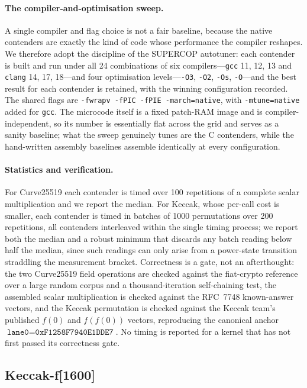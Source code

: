 \paragraph{The compiler-and-optimisation sweep.}
A single compiler and flag choice is not a fair baseline, because the native
contenders are exactly the kind of code whose performance the compiler reshapes.
We therefore adopt the discipline of the SUPERCOP autotuner: each contender is
built and run under all 24 combinations of six compilers---\texttt{gcc}
11, 12, 13 and \texttt{clang} 14, 17, 18---and four optimisation
levels---\texttt{-O3}, \texttt{-O2}, \texttt{-Os}, \texttt{-O}---and the best
result for each contender is retained, with the winning configuration recorded.
The shared flags are \texttt{-fwrapv -fPIC -fPIE -march=native}, with
\texttt{-mtune=native} added for \texttt{gcc}. The microcode itself is a fixed
patch-RAM image and is compiler-independent, so its number is essentially flat
across the grid and serves as a sanity baseline; what the sweep genuinely tunes
are the C contenders, while the hand-written assembly baselines assemble
identically at every configuration.

\paragraph{Statistics and verification.}
For Curve25519 each contender is timed over 100 repetitions of a complete scalar
multiplication and we report the median. For Keccak, whose per-call cost is
smaller, each contender is timed in batches of 1000 permutations over 200
repetitions, all contenders interleaved within the single timing process; we
report both the median and a robust minimum that discards any batch reading below
half the median, since such readings can only arise from a power-state transition
straddling the measurement bracket. Correctness is a gate, not an afterthought:
the two Curve25519 field operations are checked against the fiat-crypto reference
over a large random corpus and a thousand-iteration self-chaining test, the
assembled scalar multiplication is checked against the RFC~7748 known-answer
vectors, and the Keccak permutation is checked against the Keccak team's published
$f(0)$ and $f(f(0))$ vectors, reproducing the canonical anchor
$\texttt{lane0}=\texttt{0xF1258F7940E1DDE7}$. No timing is reported for a kernel
that has not first passed its correctness gate.

\subsection{Keccak-f[1600]}
\label{sec:results-keccak}

